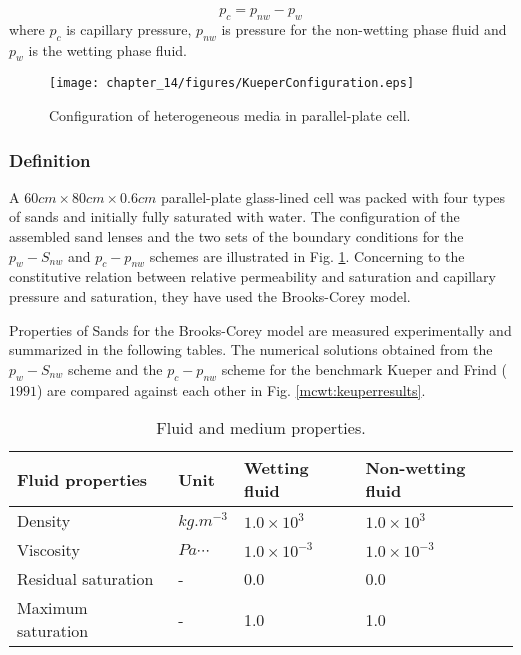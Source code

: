 \begin{equation}
p_c=p_{nw}-p_w
\label{eq:mcwtFluxEq}
\end{equation}                                                 
where $p_c$ is capillary pressure, $p_{nw}$ is pressure for the non-wetting phase fluid and $p_w$ is the wetting phase fluid. 

\begin{figure}[!htb]
\begin{center}
\texttt{[image: chapter\_14/figures/KueperConfiguration.eps]}
\end{center}
\caption{Configuration of heterogeneous media in parallel-plate cell.}
\label{mcwt:keuperconfig}
\end{figure}

\subsubsection*{Definition}
A $60cm\times80cm\times0.6cm$ parallel-plate glass-lined cell was packed with four types of sands and initially fully saturated with water. The configuration of the assembled sand lenses and the two sets of the boundary conditions for the $p_w-S_{nw}$ and $p_c-p_{nw}$ schemes are illustrated in Fig. \ref{mcwt:keuperconfig}. Concerning to the constitutive relation between relative permeability and saturation and capillary pressure and saturation, they have used the Brooks-Corey model. 

Properties of Sands for the Brooks-Corey model are measured experimentally and summarized in the following tables. The numerical solutions obtained from the $p_w-S_{nw}$ scheme and the $p_c-p_{nw}$ scheme for the benchmark Kueper and Frind ($1991$) are compared against each other in Fig. \ref{mcwt:keuperresults}. 

\begin{table}[!htb]
\begin{center}
\begin{tabular}{|l|l|l|l|}
\hline
Fluid properties & Unit & Wetting fluid	& Non-wetting fluid \\
\hline
Density &	$kg.m^{-3}$ &	$1.0\times10^3$ &	$1.0\times10^3$ \\ 
\hline
Viscosity &	$Pa\cdots$ & $1.0\times10^{-3}$ &	$1.0\times10^{-3}$ \\
\hline
Residual saturation &	- &	0.0 &	0.0 \\
\hline
Maximum saturation &	- &	1.0 &	1.0 \\
\hline
\end{tabular}
\caption{Fluid and medium properties.}
\end{center}
\end{table}

